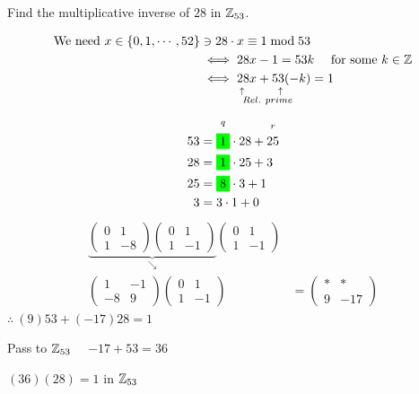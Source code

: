 \begin{example}
    Find the multiplicative inverse of $28$ in ${\mathbb{Z}}_{53}$. \\ \steezybreak

    \begin{align}
        \text{We need } x\in \{0,1,\cdots, 52\} &\ni 28\cdot x \equiv 1 \bmod 53 \nonumber \\
        &\iff 28x-1=53k \ \ \ \text{     for some }k\in {\mathbb{Z}} \nonumber \\
        &\iff \underset{\substack{\uparrow \ \ \ \ \ \ \ \  \uparrow \ \ \ \ \ \ \\ Rel. \ prime \ \ \ }}{28x+53(-k)}=1 \nonumber
    \end{align}

    \begin{align}
        53&= \overset{\substack{q \\ \ }}{\colorbox{green}{1}}\cdot 28 + \overset{\substack{r \\ \ }}{25} \nonumber \\
        28&= \colorbox{green}{1}\cdot 25 + 3 \nonumber \\
        25&= \colorbox{green}{8}\cdot 3 + 1 \nonumber \\
        3&= 3 \cdot 1 + 0 \nonumber
    \end{align}
    \begin{align}
        \underbrace{\begin{pmatrix}
            0&1 \\
            1 & -8
        \end{pmatrix}
        \begin{pmatrix}
            0&1 \\
            1 & -1
        \end{pmatrix}}_{\searrow}
        \begin{pmatrix}
            0&1 \\
            1 & -1
        \end{pmatrix}& \nonumber \\
        \begin{pmatrix}
            1&-1 \\
            -8 & 9
        \end{pmatrix}
        \begin{pmatrix}
            0&1 \\
            1 & -1
        \end{pmatrix}&= \begin{pmatrix}
            *&* \\
            9 & -17
        \end{pmatrix} \nonumber
    \end{align}
    $\therefore \ (9)53+(-17)28 = 1$ \\ \steezybreak

    \noindent Pass to ${\mathbb{Z}}_{53}$ \ \ $-17+53=36$ \\ \steezybreak

    \noindent $(36)(28)=1$ in ${\mathbb{Z}}_{53}$
\end{example}
\newpage

